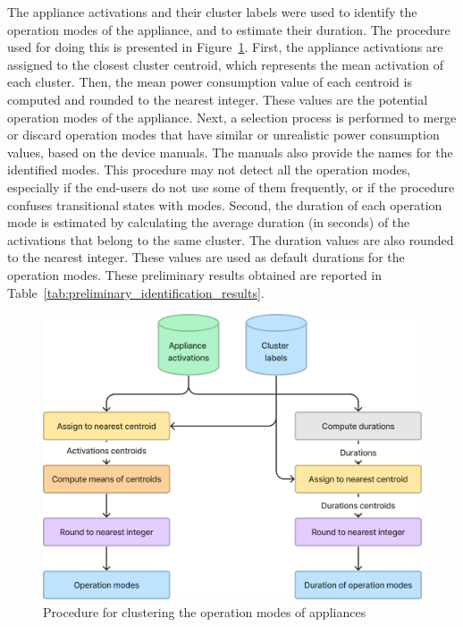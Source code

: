 The appliance activations and their cluster labels were used to identify the operation modes of the appliance, and to estimate their duration. The procedure used for doing this is presented in Figure~\ref{fig:identification}. First, the appliance activations are assigned to the closest cluster centroid, which represents the mean activation of each cluster. Then, the mean power consumption value of each centroid is computed and rounded to the nearest integer. These values are the potential operation modes of the appliance. Next, a selection process is performed to merge or discard operation modes that have similar or unrealistic power consumption values, based on the device manuals. The manuals also provide the names for the identified modes. This procedure may not detect all the operation modes, especially if the end-users do not use some of them frequently, or if the procedure confuses transitional states with modes. Second, the duration of each operation mode is estimated by calculating the average duration (in seconds) of the activations that belong to the same cluster. The duration values are also rounded to the nearest integer. These values are used as default durations for the operation modes. These preliminary results obtained are reported in Table~\ref{tab:preliminary_identification_results}.

\begin{figure}[h]
    \centering
    \includegraphics[width=.55\linewidth]{images/identification.png}
    \caption{Procedure for clustering the operation modes of appliances}
    \label{fig:identification}
\end{figure}

